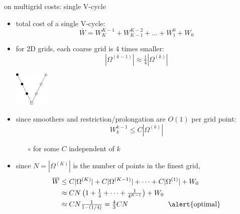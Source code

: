 \documentclass[10pt,
               svgnames,
               hyperref={colorlinks,citecolor=DeepPink4,linkcolor=FireBrick,urlcolor=Maroon},
               usepdftitle=false]{beamer}
\begin{document}
\begin{frame}{on multigrid costs: single V-cycle}
\begin{itemize}
\item total cost of a single V-cycle:
    $$\overline{W} = W_K^{K-1} + W_{K-1}^{K-2} + \dots + W_1^0 + W_0$$
\item for 2D grids, each coarse grid is 4 times smaller:
    $$|\Omega^{(k-1)}| \approx \tfrac{1}{4} |\Omega^{(k)}|$$

\vspace{-28mm}
\hfill \includegraphics[width=0.13\textwidth]{images/vcycle.png}

\vspace{9mm}
\item since smoothers and restriction/prolongation are $O(1)$ per grid point:
    $$W_k^{k-1} \le C |\Omega^{(k)}|$$

    \begin{itemize}
    \item[$\circ$] for some $C$ independent of $k$
    \end{itemize}
\item<2> since $N=|\Omega^{(K)}|$ is the number of points in the finest grid,
\begin{align*}
\overline{W} &\le C |\Omega^{(K)}| + C |\Omega^{(K-1)}| + \dots + C |\Omega^{(1)}| + W_0 \\
    &\approx C N \left(1 + \tfrac{1}{4} + \dots + \tfrac{1}{4^{K-1}}\right) + W_0 \\
    &\approx C N \tfrac{1}{1-(1/4)} = \tfrac{4}{3} C N \hspace{20mm} \text{\alert{optimal}}
\end{align*}
\end{itemize}
\end{frame}
\end{document}
